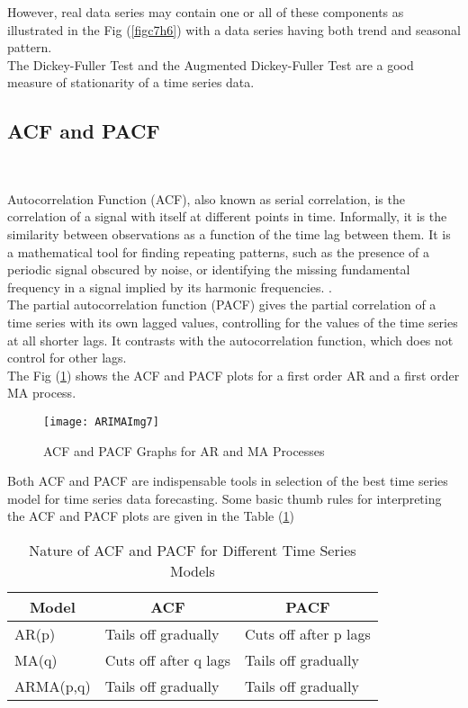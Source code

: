 However, real data series may contain one or all of these  components as illustrated in the Fig (\ref{figc7h6}) with a data series having both trend and seasonal pattern.\\

The Dickey-Fuller Test and the Augmented Dickey-Fuller Test are a good measure of stationarity of a time series data.

\subsection{ACF and PACF}
\
\
\
\

Autocorrelation Function (ACF), also known as serial correlation, is the correlation of a signal with itself at different points in time. Informally, it is the similarity between observations as a function of the time lag between them. It is a mathematical tool for finding repeating patterns, such as the presence of a periodic signal obscured by noise, or identifying the missing fundamental frequency in a signal implied by its harmonic frequencies. .\\

The partial autocorrelation function (PACF) gives the partial correlation of a time series with its own lagged values, controlling for the values of the time series at all shorter lags. It contrasts with the autocorrelation function, which does not control for other lags.\\

The Fig (\ref{figc7h7}) shows the ACF and PACF plots for a first order AR and a first order MA process.

\begin{figure}[H]
\centering
\texttt{[image: ARIMAImg7]}
\caption{ACF and PACF Graphs for AR and MA Processes}
\label{figc7h7} %
\end{figure}

Both ACF and PACF are indispensable tools in selection of the best time series model for time series data forecasting. Some basic thumb rules for interpreting the ACF and PACF plots are given in the Table (\ref{ARIMATab1})

\begin{table}[H]
  \centering
  \caption{Nature of ACF and PACF for Different Time Series Models}
    \begin{tabular}{|l|l|l|}
    \hline
    \multicolumn{1}{|c|}{\textbf{Model}} & \multicolumn{1}{c|}{\textbf{ACF}} & \multicolumn{1}{c|}{\textbf{PACF}} \bigstrut\\
    \hline
    AR(p) & Tails off gradually & Cuts off after p lags \bigstrut\\
    \hline
    MA(q) & Cuts off after q lags & Tails off gradually \bigstrut\\
    \hline
    ARMA(p,q) & Tails off gradually & Tails off gradually \bigstrut\\
    \hline
    \end{tabular}%
  \label{ARIMATab1}%
\end{table}%

